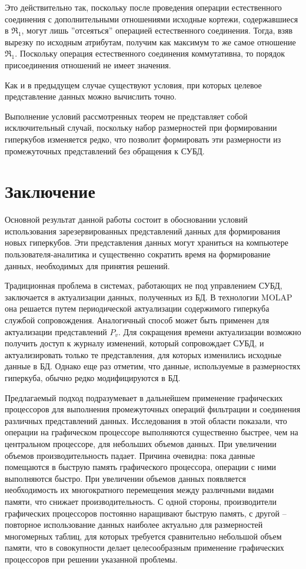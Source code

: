 \documentclass[10pt,a4paper]{article}
\begin{document}
Это действительно так, поскольку после проведения операции естественного соединения
с дополнительными отношениями исходные кортежи, содержавшиеся в $\Re_1$, могут
лишь ''отсеяться'' операцией естественного соединения. Тогда, взяв вырезку по
исходным атрибутам, получим как максимум то же самое отношение $\Re_1$. Поскольку
операция естественного соединения коммутативна, то порядок присоединения отношений
не имеет значения.



Как и в предыдущем случае существуют условия, при которых целевое представление
данных можно вычислить точно.



Выполнение условий рассмотренных теорем не представляет собой  исключительный случай,
поскольку набор размерностей при формировании гиперкубов изменяется редко, что позволит
формировать эти размерности из промежуточных представлений без обращения к СУБД.

\section{Заключение}

Основной результат данной работы состоит в обосновании условий использования
зарезервированных представлений данных для формирования новых гиперкубов.
Эти представления данных могут храниться на компьютере пользователя-аналитика
и существенно сократить время на формирование данных, необходимых для принятия решений.

Традиционная проблема в системах, работающих не под управлением СУБД, заключается
в актуализации данных, полученных из БД. В технологии MOLAP она решается путем периодической
актуализации содержимого гиперкуба службой сопровождения. Аналогичный способ может быть
применен для актуализации представлений $P_v$. Для сокращения времени актуализации возможно
получить доступ к журналу изменений, который сопровождает СУБД, и актуализировать только те
представления, для которых изменились исходные данные в БД. Однако еще раз отметим, что данные,
используемые в размерностях гиперкуба, обычно редко модифицируются в БД.

Предлагаемый подход подразумевает в дальнейшем применение графических процессоров
для выполнения промежуточных операций фильтрации и соединения различных представлений данных.
Исследования в этой области показали, что операции на графическом процессоре выполняются
существенно быстрее, чем на центральном процессоре, для небольших объемов данных. При увеличении
объемов производительность падает. Причина очевидна: пока данные помещаются в быструю память
графического процессора, операции с ними выполняются быстро. При увеличении объемов данных появляется
необходимость их многократного перемещения между различными видами памяти, что снижает
производительность. С одной стороны, производители графических процессоров постоянно наращивают
быструю память, с другой – повторное использование данных наиболее актуально для размерностей
многомерных таблиц, для которых требуется сравнительно небольшой объем памяти, что в совокупности
делает целесообразным применение графических процессоров при решении указанной проблемы.



\end{document}
